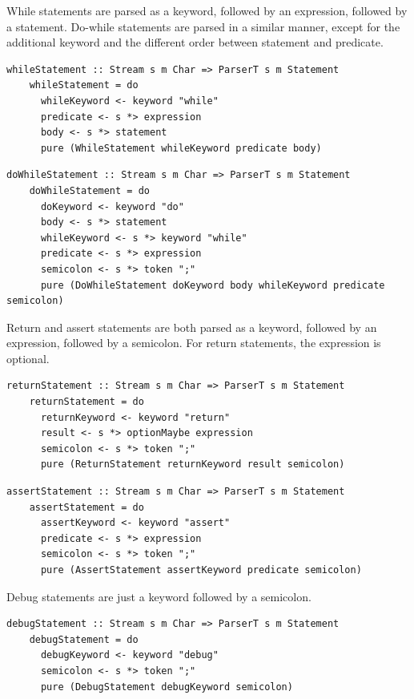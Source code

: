 \documentclass[UdineBachThesis,american,11pt,draft]{PhdThesis}
\begin{document}
  While statements are parsed as a \lstinline@while@ keyword, followed by an
  expression, followed by a statement. Do-while statements are parsed in a
  similar manner, except for the additional \lstinline@do@ keyword and the
  different order between statement and predicate.

  \begin{lstlisting}[gobble=4,basicstyle=\ttfamily\small]
    whileStatement :: Stream s m Char => ParserT s m Statement
    whileStatement = do
      whileKeyword <- keyword "while"
      predicate <- s *> expression
      body <- s *> statement
      pure (WhileStatement whileKeyword predicate body)
  \end{lstlisting}

  \begin{lstlisting}[gobble=4,basicstyle=\ttfamily\small]
    doWhileStatement :: Stream s m Char => ParserT s m Statement
    doWhileStatement = do
      doKeyword <- keyword "do"
      body <- s *> statement
      whileKeyword <- s *> keyword "while"
      predicate <- s *> expression
      semicolon <- s *> token ";"
      pure (DoWhileStatement doKeyword body whileKeyword predicate semicolon)
  \end{lstlisting}

  Return and assert statements are both parsed as a keyword, followed by an
  expression, followed by a semicolon. For return statements, the expression is
  optional.

  \begin{lstlisting}[gobble=4,basicstyle=\ttfamily\small]
    returnStatement :: Stream s m Char => ParserT s m Statement
    returnStatement = do
      returnKeyword <- keyword "return"
      result <- s *> optionMaybe expression
      semicolon <- s *> token ";"
      pure (ReturnStatement returnKeyword result semicolon)
  \end{lstlisting}

  \begin{lstlisting}[gobble=4,basicstyle=\ttfamily\small]
    assertStatement :: Stream s m Char => ParserT s m Statement
    assertStatement = do
      assertKeyword <- keyword "assert"
      predicate <- s *> expression
      semicolon <- s *> token ";"
      pure (AssertStatement assertKeyword predicate semicolon)
  \end{lstlisting}

  Debug statements are just a \lstinline@debug@ keyword followed by a semicolon.

  \begin{lstlisting}[gobble=4,basicstyle=\ttfamily\small]
    debugStatement :: Stream s m Char => ParserT s m Statement
    debugStatement = do
      debugKeyword <- keyword "debug"
      semicolon <- s *> token ";"
      pure (DebugStatement debugKeyword semicolon)
  \end{lstlisting}
\end{document}
